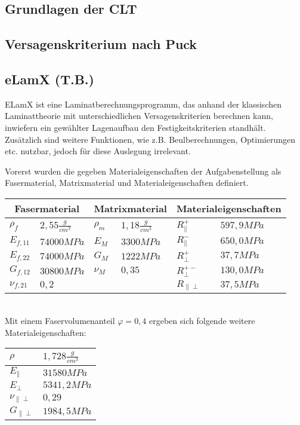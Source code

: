 \subsection{Grundlagen der CLT}
\subsection{Versagenskriterium nach Puck}
\subsection{eLamX (T.B.)}
ELamX ist eine Laminatberechnungsprogramm, das anhand der klassischen Laminattheorie mit unterschiedlichen Versagenskriterien berechnen kann, inwiefern ein gewählter Lagenaufbau den Festigkeitskriterien standhält. Zusätzlich sind weitere Funktionen, wie z.B. Beulberechnungen, Optimierungen etc. nutzbar, jedoch für diese Auslegung irrelevant.

\noindent Vorerst wurden die gegeben Materialeigenschaften der Aufgabenstellung als Fasermaterial, Matrixmaterial und  Materialeigenschaften definiert.\\

\begin{tabular}{ll|ll|ll}
	\multicolumn{2}{c}{Fasermaterial} &\multicolumn{2}{c}{Matrixmaterial}  &\multicolumn{2}{c}{Materialeigenschaften} \\
	\hline
	$\rho_{f}$ & $2,55 \frac{g}{cm^{3}}$  & $\rho_{m}$ & $1,18 \frac{g}{cm^{3}}$  & $R_{\parallel}^{+}$ & $597,9MPa$ \\
	\hline
	$E_{f,11}$ & $74000MPa$  & $E_{M}$ & $3300MPa$  & $R_{\parallel}^{-}$ & $650,0MPa$\\
	\hline
	$E_{f,22}$ & $74000MPa$  & $G_{M}$ & $1222MPa$  & $R_{\perp}^{+}$ & $37,7MPa$\\
	\hline
	$G_{f,12}$ & $30800MPa$ & $\nu_{M}$ & $0,35$  & $R_{\perp}^{+-}$ & $130,0MPa$\\
	\hline
	$\nu_{f,21}$ & $0,2$  & &   & $R_{\parallel\perp}$ & $37,5MPa$\\
\end{tabular}\\

\noindent Mit einem Faservolumenanteil $\varphi=0,4$ ergeben sich folgende weitere Materialeigenschaften:\\

\begin{tabular}{ll}
	$\rho$ & $1,728 \frac{g}{cm^{3}}$ \\
	\hline
	$E_{\parallel}$ & $31580 MPa$\\
	\hline
	$E_{\perp}$ & $5341,2MPa$\\
	\hline
	$\nu_{\parallel\perp}$ & $0,29$\\
	\hline
	$G_{\parallel\perp}$ & $1984,5 MPa$\\
\end{tabular}\\

